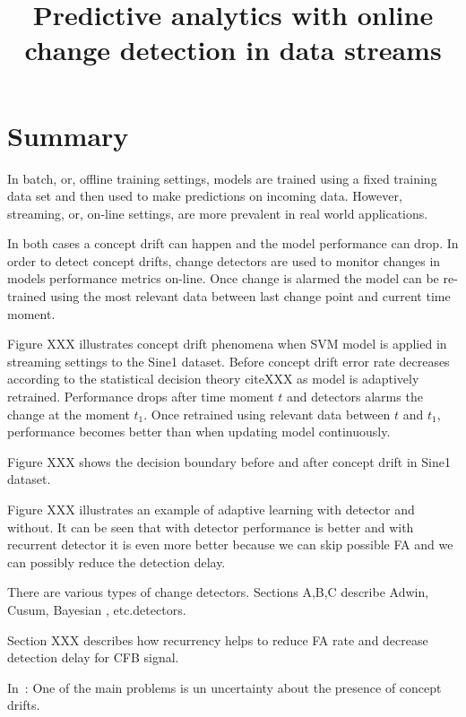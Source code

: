 \documentclass[12 pt]{article}
\title{Predictive analytics with online change detection in data streams}
\date{}
\begin{document}
	\maketitle
  \section{Summary}
  
  In batch, or, offline training settings, models are trained using a fixed training data set and then used to make predictions on incoming data. However, streaming, or, on-line settings, are more prevalent in real world applications. 

  In both cases a concept drift can happen and the model performance can drop. In order to detect concept drifts, change detectors are used to monitor changes in models performance metrics on-line. Once change is alarmed the model can be re-trained using the most relevant data between last change point and current time moment.

  Figure XXX illustrates concept drift phenomena when SVM model is applied in streaming settings to the Sine1 dataset. Before concept drift error rate decreases according to the statistical decision theory cite{XXX} as model is adaptively retrained. Performance drops after time moment $t$ and detectors alarms the change at the moment $t_1$. Once retrained using relevant data between $t$ and $t_1$, performance becomes better than when updating model continuously.

  Figure XXX shows the decision boundary before and after concept drift in Sine1 dataset.

  Figure XXX illustrates an example of adaptive learning with detector and without. It can be seen that with detector performance is better and with recurrent detector it is even more better because we can skip possible FA and we can possibly reduce the detection delay.

  There are various types of change detectors. Sections A,B,C describe Adwin, Cusum, Bayesian , etc.detectors.

  Section XXX describes how recurrency helps to reduce FA rate and decrease detection delay for CFB signal.


  In~\cite{SouzaRMB20}: One of the main problems is un uncertainty about the presence of concept drifts.
\end{document}
